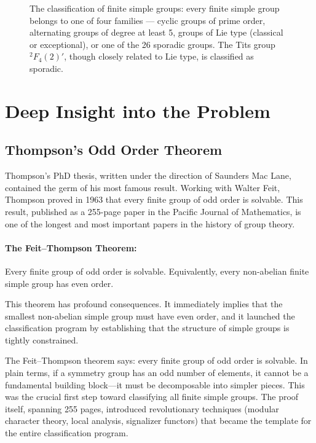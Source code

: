 \begin{figure}[htbp]
\caption{The classification of finite simple groups: every finite simple group belongs to one of four families — cyclic groups of prime order, alternating groups of degree at least 5, groups of Lie type (classical or exceptional), or one of the 26 sporadic groups. The Tits group ${}^2F_4(2)'$, though closely related to Lie type, is classified as sporadic.}
\label{fig:finite_simple_groups_thompson}
\end{figure}

\section{Deep Insight into the Problem}

\subsection{Thompson's Odd Order Theorem}

Thompson's PhD thesis, written under the direction of Saunders Mac Lane, contained the germ of his most famous result. Working with Walter Feit, Thompson proved in 1963 that every finite group of odd order is solvable. This result, published as a 255-page paper in the Pacific Journal of Mathematics, is one of the longest and most important papers in the history of group theory.

\paragraph{The Feit--Thompson Theorem:} Every finite group of odd order is solvable. Equivalently, every non-abelian finite simple group has even order.

This theorem has profound consequences. It immediately implies that the smallest non-abelian simple group must have even order, and it launched the classification program by establishing that the structure of simple groups is tightly constrained.

\begin{bigidea}
The Feit--Thompson theorem says: every finite group of odd order is solvable. In plain terms, if a symmetry group has an odd number of elements, it cannot be a fundamental building block---it must be decomposable into simpler pieces. This was the crucial first step toward classifying all finite simple groups. The proof itself, spanning 255 pages, introduced revolutionary techniques (modular character theory, local analysis, signalizer functors) that became the template for the entire classification program.
\end{bigidea}

